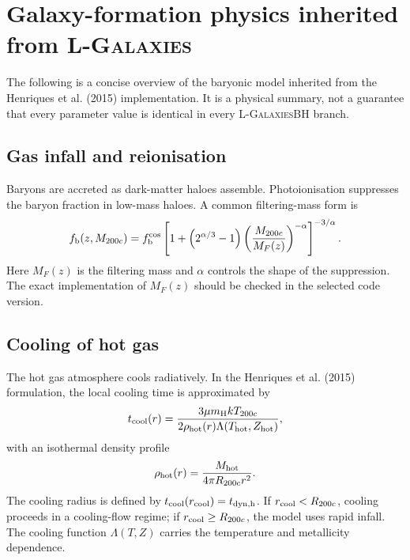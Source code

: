\documentclass[11pt,a4paper]{article}
\newcommand{\Lgal}{\textsc{L-Galaxies}}
\newcommand{\Lgalbh}{\textsc{L-GalaxiesBH}}
\begin{document}
\newpage

\section{Galaxy-formation physics inherited from \Lgal}

The following is a concise overview of the baryonic model inherited from the Henriques et al. (2015) implementation. It is a physical summary, not a guarantee that every parameter value is identical in every \Lgalbh{} branch.

\subsection{Gas infall and reionisation}

Baryons are accreted as dark-matter haloes assemble. Photoionisation suppresses the baryon fraction in low-mass haloes. A common filtering-mass form is
\begin{equation}
 f_{\rm b}(z,M_{200c})=f_{\rm b}^{\rm cos}
 \left[1+\left(2^{\alpha/3}-1\right)
 \left(\frac{M_{200c}}{M_F(z)}\right)^{-\alpha}\right]^{-3/\alpha}.
\end{equation}
Here $M_F(z)$ is the filtering mass and $\alpha$ controls the shape of the suppression. The exact implementation of $M_F(z)$ should be checked in the selected code version.

\subsection{Cooling of hot gas}

The hot gas atmosphere cools radiatively. In the Henriques et al. (2015) formulation, the local cooling time is approximated by
\begin{equation}
 t_{\rm cool}(r)=\frac{3\mu m_{\rm H}kT_{200c}}
 {2\rho_{\rm hot}(r)\Lambda(T_{\rm hot},Z_{\rm hot})},
\end{equation}
with an isothermal density profile
\begin{equation}
 \rho_{\rm hot}(r)=\frac{M_{\rm hot}}{4\pi R_{200c}r^2}.
\end{equation}
The cooling radius is defined by $t_{\rm cool}(r_{\rm cool})=t_{\rm dyn,h}$. If $r_{\rm cool}<R_{200c}$, cooling proceeds in a cooling-flow regime; if $r_{\rm cool}\geq R_{200c}$, the model uses rapid infall. The cooling function $\Lambda(T,Z)$ carries the temperature and metallicity dependence.
\end{document}
